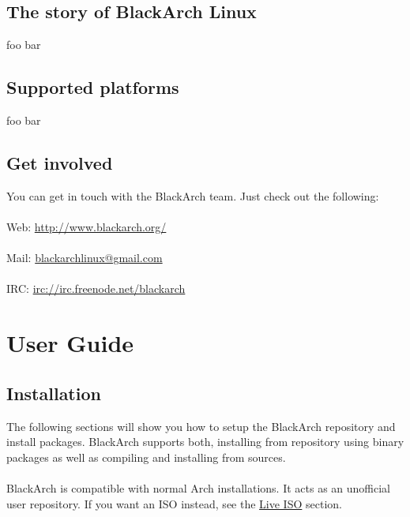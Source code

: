 \documentclass[a4paper, oneside, 11pt]{book}
\begin{document}
\section{The story of BlackArch Linux}
foo bar

\section{Supported platforms}
foo bar

\section{Get involved}
You can get in touch with the BlackArch team. Just check out the following:
\\\\
Web: \url{http://www.blackarch.org/}
\\\\
Mail: \href{mailto:blackarchlinux@gmail.com}{blackarchlinux@gmail.com}
\\\\
IRC: \url{irc://irc.freenode.net/blackarch}


\chapter{User Guide}

\section{Installation}
The following sections will show you how to setup the BlackArch repository and
install packages. BlackArch supports both, installing from repository using
binary packages as well as compiling and installing from sources.
\\\\
BlackArch is compatible with normal Arch installations. It acts as an unofficial
user repository. If you want an ISO instead, see the
\href{http://www.blackarch.org/download.html#iso}{Live ISO} section.
\\\\
\end{document}
